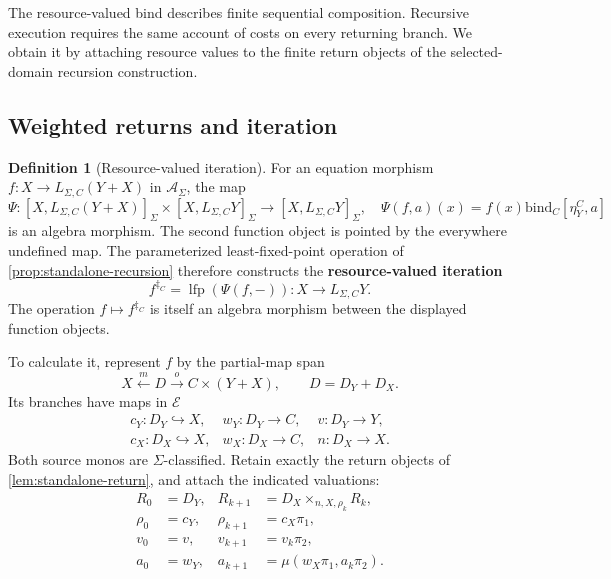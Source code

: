 \documentclass[11pt,a4paper]{article}
\numberwithin{algorithm}{section}
\numberwithin{equation}{section}
\theoremstyle{definition}
\newtheorem{definition}[definition]{Definition}
\theoremstyle{remark}
\theoremstyle{plain}
\newcommand{\E}{\mathcal E}
\newcommand{\AS}{\mathcal A_{\Sigma}}
\newcommand{\LC}{L_{\Sigma,C}}
\newcommand{\incl}{\hookrightarrow}
\newcommand{\bind}{\mathbin{\mathrm{bind}}}
\theoremstyle{definition}
\theoremstyle{plain}
\begin{document}
The resource-valued bind describes finite sequential composition.
Recursive execution requires the same account of costs on every
returning branch. We obtain it by attaching resource values to the
finite return objects of the selected-domain recursion construction.

\subsection{Weighted returns and iteration}


\begin{definition}[Resource-valued iteration]\label{def:resource-iteration}
For an equation morphism $f:X\to\LC(Y+X)$ in $\AS$, the map
\[
 \Psi:[X,\LC(Y+X)]_\Sigma\times[X,\LC Y]_\Sigma
       \longrightarrow[X,\LC Y]_\Sigma,
 \quad\Psi(f,a)(x)=f(x)\bind_C[\eta^C_Y,a]
\]
is an algebra morphism. The second function object is pointed by the
everywhere undefined map. The parameterized least-fixed-point operation
of \cref{prop:standalone-recursion} therefore constructs the \textbf{resource-valued iteration}
\[
 f^{\ddagger_C}=\operatorname{lfp}(\Psi(f,-)):X\to\LC Y.
\]
The operation $f\mapsto f^{\ddagger_C}$ is itself an algebra morphism
between the displayed function objects.
\end{definition}


To calculate it, represent $f$ by the partial-map span
\[
 X\xleftarrow{m}D\xrightarrow{o}C\times(Y+X),\qquad D=D_Y+D_X.
\]
Its branches have maps in $\E$
\[
 \begin{array}{lll}
 c_Y:D_Y\incl X,&w_Y:D_Y\to C,&v:D_Y\to Y,\\
 c_X:D_X\incl X,&w_X:D_X\to C,&n:D_X\to X.
 \end{array}
\]
Both source monos are $\Sigma$-classified. Retain exactly the return
objects of \cref{lem:standalone-return}, and attach the indicated valuations:
\begin{align*}
 R_0&=D_Y,&R_{k+1}&=D_X\times_{n,X,\rho_k}R_k,\\
 \rho_0&=c_Y,&\rho_{k+1}&=c_X\pi_1,\\
 v_0&=v,&v_{k+1}&=v_k\pi_2,\\
 a_0&=w_Y,&a_{k+1}&=\mu(w_X\pi_1,a_k\pi_2).
\end{align*}
\end{document}
